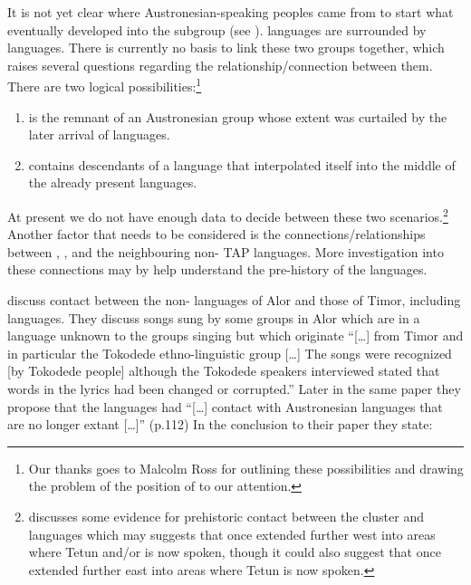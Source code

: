 It is not yet clear where Austronesian-speaking peoples came
from to start what eventually developed into the  subgroup (see ).
 languages are surrounded by  languages.
There is currently no basis to link these two groups together,
which raises several questions regarding the relationship/connection between them.
There are two logical possibilities:\footnote{
		Our thanks goes
		to Malcolm Ross for outlining these possibilities
		and drawing the problem of the position of 
		to our attention.}

\begin{enumerate}
	\item	{} is the remnant of an Austronesian group
				whose extent was curtailed by the later arrival of  languages.
	\item	{} contains descendants of a language
				that interpolated itself into the middle of the
				already present  languages.
\end{enumerate}

At present we do not have enough data to decide between these
two scenarios.\footnote{
		\citet[67f]{Edwards2021} discusses some evidence for prehistoric contact between the 
		cluster and  languages which may suggests that  once extended further west into areas where Tetun and/or
		 is now spoken,
		though it could also suggest that  once extended further
		east into areas where Tetun is now spoken.}
Another factor that
needs to be considered is the connections/relationships between
, , and the neighbouring non- TAP languages.
More investigation into these connections may by help understand
the pre-history of the  languages.

\citet{SchapperWellfelt2018} discuss contact between the non-
languages of Alor and those of Timor,
including  languages.
They discuss songs sung by some groups in Alor which are in a
language unknown to the groups singing but which originate “[{\ldots}]
from Timor and in particular the Tokodede ethno-linguistic group [{\ldots}]
The songs were recognized [by Tokodede people] although the Tokodede
speakers interviewed stated that words in the lyrics had been
changed or corrupted.” Later in the same paper they propose that
the  languages had “[{\ldots}] contact with
Austronesian languages that are no longer extant [{\ldots}]”
(p.112) In the conclusion to their paper they state:

